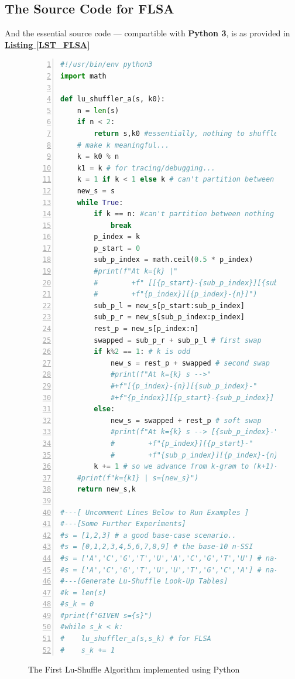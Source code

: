 \documentclass[a4paper, 18pt]{book} %
\begin{document}
\subsection{The Source Code for FLSA}

And the essential source code --- compartible with \textbf{Python 3}, is as provided in \textbf{\hyperref[LST_FLSA]{Listing \ref{LST_FLSA}}}


\begin{figure}[H]
  \begin{center}
  \begin{lstlisting}[caption={The FLSA}, label={LST_FLSA}, language=Python, frame=single, numbers=left, basicstyle=\ttfamily,  commentstyle=\color{blue}]
#!/usr/bin/env python3
import math

def lu_shuffler_a(s, k0):
    n = len(s)
    if n < 2:
        return s,k0 #essentially, nothing to shuffle
    # make k meaningful...
    k = k0 % n
    k1 = k # for tracing/debugging...
    k = 1 if k < 1 else k # can't partition between nothing
    new_s = s
    while True:
        if k == n: #can't partition between nothing
            break
        p_index = k
        p_start = 0
        sub_p_index = math.ceil(0.5 * p_index)
        #print(f"At k={k} |"
        #        +f" [[{p_start}-{sub_p_index}][{sub_p_index}-"
        #        +f"{p_index}][{p_index}-{n}]")
        sub_p_l = new_s[p_start:sub_p_index]
        sub_p_r = new_s[sub_p_index:p_index]
        rest_p = new_s[p_index:n]
        swapped = sub_p_r + sub_p_l # first swap
        if k%2 == 1: # k is odd
            new_s = rest_p + swapped # second swap
            #print(f"At k={k} s -->"
            #+f"[{p_index}-{n}][{sub_p_index}-"
            #+f"{p_index}][{p_start}-{sub_p_index}] == {new_s}")
        else:
            new_s = swapped + rest_p # soft swap
            #print(f"At k={k} s --> [{sub_p_index}-"
            #        +f"{p_index}][{p_start}-"
            #        +f"{sub_p_index}][{p_index}-{n}] == {new_s}")
        k += 1 # so we advance from k-gram to (k+1)-grams
    #print(f"k={k1} | s={new_s}")
    return new_s,k

#---[ Uncomment Lines Below to Run Examples ]
#---[Some Further Experiments]
#s = [1,2,3] # a good base-case scenario..
#s = [0,1,2,3,4,5,6,7,8,9] # the base-10 n-SSI
#s = ['A','C','G','T','U','A','C','G','T','U'] # na-SS+na-SS
#s = ['A','C','G','T','U','U','T','G','C','A'] # na-SS+complement(na-SS)
#---[Generate Lu-Shuffle Look-Up Tables]
#k = len(s)
#s_k = 0
#print(f"GIVEN s={s}")
#while s_k < k:
#    lu_shuffler_a(s,s_k) # for FLSA
#    s_k += 1
\end{lstlisting}
  \end{center}
  \caption{The First Lu-Shuffle Algorithm implemented using Python}
\end{figure}
\end{document}
